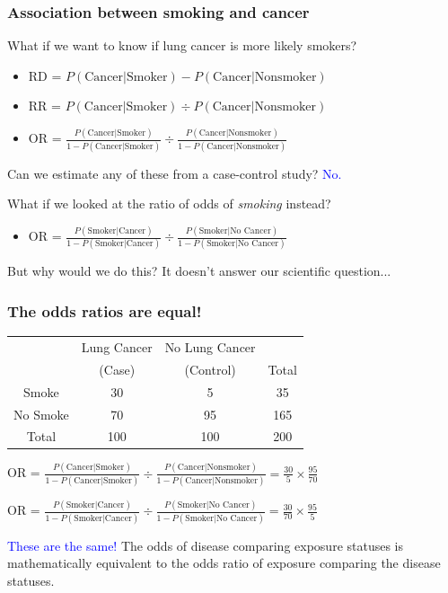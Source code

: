 \documentclass[12pt, 
hyperref={colorlinks=true, linkcolor=blue, urlcolor=cyan}]{beamer}
\begin{document}
\begin{frame}
\frametitle{Association between smoking and cancer}

What if we want to know if lung cancer is more likely smokers?

\begin{itemize}
\item RD = $P(\text{Cancer}|\text{Smoker}) - P(\text{Cancer}|\text{Nonsmoker})$
\item RR = $P(\text{Cancer}|\text{Smoker}) \div P(\text{Cancer}|\text{Nonsmoker})$
\item OR = $\frac{P(\text{Cancer}|\text{Smoker})}{1-P(\text{Cancer}|\text{Smoker})} \div \frac{P(\text{Cancer}|\text{Nonsmoker})}{1-P(\text{Cancer}|\text{Nonsmoker})}$
\end{itemize}

Can we estimate any of these from a case-control study? \pause \textcolor{blue}{No.} \pause

What if we looked at the ratio of odds of \textit{smoking} instead?
\begin{itemize}
\item OR = $\frac{P(\text{Smoker}|\text{Cancer})}{1-P(\text{Smoker}|\text{Cancer})} \div \frac{P(\text{Smoker}|\text{No Cancer})}{1-P(\text{Smoker}|\text{No Cancer})}$
\end{itemize}

But why would we do this? It doesn't answer our scientific question...
\end{frame}

\begin{frame}
\frametitle{The odds ratios are equal!}
\begin{center}
\begin{table}
	\begin{tabular}{|c|cc|c|}
	\hline 
	& Lung Cancer & No Lung Cancer &  \\ 
	& (Case) & (Control) & Total  \\
	\hline 
	Smoke & 30 & 5  & 35 \\ 
	No Smoke & 70 & 95 & 165  \\ 
	\hline 
	Total & 100 & 100 & 200 \\ 
	\hline 
	\end{tabular}
\end{table}
\end{center}

OR = $\frac{P(\text{Cancer}|\text{Smoker})}{1-P(\text{Cancer}|\text{Smoker})} \div \frac{P(\text{Cancer}|\text{Nonsmoker})}{1-P(\text{Cancer}|\text{Nonsmoker})} = \frac{30}{5}\times \frac{95}{70} $

OR = $\frac{P(\text{Smoker}|\text{Cancer})}{1-P(\text{Smoker}|\text{Cancer})} \div \frac{P(\text{Smoker}|\text{No Cancer})}{1-P(\text{Smoker}|\text{No Cancer})} = \frac{30}{70} \times \frac{95}{5}$

\textcolor{blue}{These are the same!}
The odds of disease comparing exposure statuses is mathematically equivalent to the odds ratio of exposure comparing the disease statuses.
\end{frame}
\end{document}
